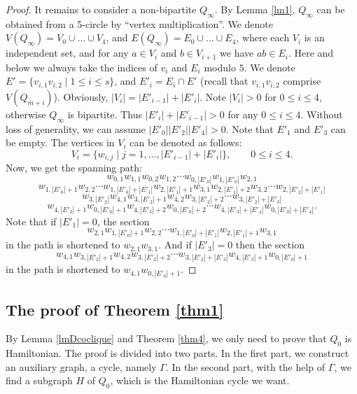 \documentclass{amsart}
\theoremstyle{definition}
\begin{document}
\begin{proof}
It remains to consider a non-bipartite $Q_{\infty}$. By Lemma \ref{lm1},
$Q_{\infty}$ can be obtained from a 5-circle by ``vertex multiplication''. We
denote $V(Q_{\infty})=V_0\cup \dots \cup V_4$, and
$E(Q_{\infty})=E_0\cup \dots \cup E_4$, where each $V_i$ is an
independent set, and  for any $a\in V_i$ and $b\in V_{i+1}$ we have $ab\in E_i$. 
Here and below we always take the indices of $v_i$ and $E_i$ modulo $5$.
We denote
$E'=\{v_{i,1}v_{i,2}\mid 1\leq i\leq s\}$, and $E'_i=E_i\cap E'$ (recall that $v_{i,1}v_{i,2}$
comprise $V(Q_{m+i})$). Obviously,
$|V_i|=|E'_{i-1}|+|E'_i|$. Note $|V_i|>0$ for $0\leq i\leq 4$, otherwise
$Q_{\infty}$ is bipartite. Thus $|E'_i|+|E'_{i-1}|>0$ for any $0\leq i\leq 4$. 
Without loss of generality, we can assume $|E'_0||E'_2||E'_4|>0$.
Note that $E'_1$ and $E'_3$ can be empty.
The vertices in $V_i$ can be denoted as follows:
$$V_i=\{w_{i,j}\mid j=1,\ldots,|E'_{i-1}|+|E'_i|\},\qquad 0\leq i\leq 4.$$
Now, we get the spanning path:
$$w_{0,1}w_{1,1}w_{0,2}w_{1,2}\cdots w_{0,|E'_0|}w_{1,|E'_0|}w_{2,1}$$
$$w_{1,|E'_0|+1}w_{2,2}\cdots w_{1,|E'_0|+|E'_1|}w_{2,|E'_1|+1}w_{3,1}w_{2,|E'_1|+2}w_{3,2}\cdots w_{2,|E'_2|+|E'_1|}$$
$$w_{3,|E'_2|}w_{4,1}w_{3,|E'_2|+1}w_{4,2}w_{3,|E'_2|+2}\cdots w_{3,|E'_2|+|E'_3|}$$
$$w_{4,|E'_3|+1}w_{0,|E'_0|+1}w_{4,|E'_3|+2}w_{0,|E'_0|+2}\cdots w_{4,|E'_3|+|E'_4|}w_{0,|E'_0|+|E'_4|}.$$
Note that if $|E'_1|=0$, the section $$w_{2,1}w_{1,|E'_0|+1}w_{2,2}\cdots w_{1,|E'_0|+|E'_1|}w_{2,|E'_1|+1}w_{3,1}$$ in the path is shortened to $w_{2,1}w_{3,1}$. And if $|E'_3|=0$ then the section $$w_{4,1}w_{3,|E'_2|+1}w_{4,2}w_{3,|E'_2|+2}\cdots w_{3,|E'_2|+|E'_3|}w_{4,|E'_3|+1}w_{0,|E'_0|+1}$$ in the path is shortened to $w_{4,1}w_{0,|E'_0|+1}$.
\end{proof}

\subsection{The proof of Theorem \ref{thm1}}
By Lemma \ref{lmDcoclique} and Theorem \ref{thm4}, we only need to prove that $Q_0$ is Hamiltonian.
The proof is divided into two parts. In the first part, we construct an auxiliary graph, a cycle, namely $\Gamma$. In the second part, with the help of $\Gamma$, we find a subgraph $H$ of $Q_0$,  which is the Hamiltonian cycle we want.
\end{document}
